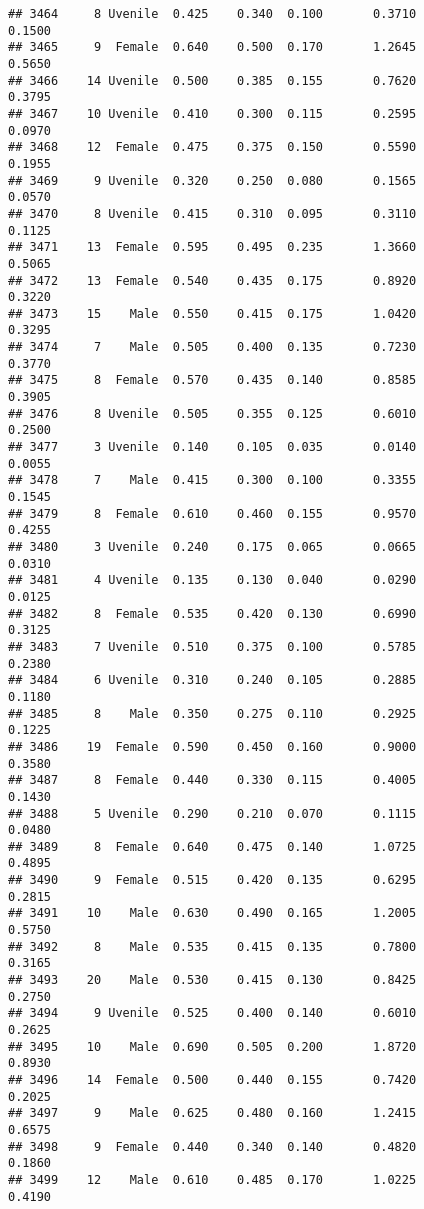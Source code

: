 \documentclass[
]{article}
\begin{document}
\begin{verbatim}
## 3464     8 Uvenile  0.425    0.340  0.100       0.3710         0.1500
## 3465     9  Female  0.640    0.500  0.170       1.2645         0.5650
## 3466    14 Uvenile  0.500    0.385  0.155       0.7620         0.3795
## 3467    10 Uvenile  0.410    0.300  0.115       0.2595         0.0970
## 3468    12  Female  0.475    0.375  0.150       0.5590         0.1955
## 3469     9 Uvenile  0.320    0.250  0.080       0.1565         0.0570
## 3470     8 Uvenile  0.415    0.310  0.095       0.3110         0.1125
## 3471    13  Female  0.595    0.495  0.235       1.3660         0.5065
## 3472    13  Female  0.540    0.435  0.175       0.8920         0.3220
## 3473    15    Male  0.550    0.415  0.175       1.0420         0.3295
## 3474     7    Male  0.505    0.400  0.135       0.7230         0.3770
## 3475     8  Female  0.570    0.435  0.140       0.8585         0.3905
## 3476     8 Uvenile  0.505    0.355  0.125       0.6010         0.2500
## 3477     3 Uvenile  0.140    0.105  0.035       0.0140         0.0055
## 3478     7    Male  0.415    0.300  0.100       0.3355         0.1545
## 3479     8  Female  0.610    0.460  0.155       0.9570         0.4255
## 3480     3 Uvenile  0.240    0.175  0.065       0.0665         0.0310
## 3481     4 Uvenile  0.135    0.130  0.040       0.0290         0.0125
## 3482     8  Female  0.535    0.420  0.130       0.6990         0.3125
## 3483     7 Uvenile  0.510    0.375  0.100       0.5785         0.2380
## 3484     6 Uvenile  0.310    0.240  0.105       0.2885         0.1180
## 3485     8    Male  0.350    0.275  0.110       0.2925         0.1225
## 3486    19  Female  0.590    0.450  0.160       0.9000         0.3580
## 3487     8  Female  0.440    0.330  0.115       0.4005         0.1430
## 3488     5 Uvenile  0.290    0.210  0.070       0.1115         0.0480
## 3489     8  Female  0.640    0.475  0.140       1.0725         0.4895
## 3490     9  Female  0.515    0.420  0.135       0.6295         0.2815
## 3491    10    Male  0.630    0.490  0.165       1.2005         0.5750
## 3492     8    Male  0.535    0.415  0.135       0.7800         0.3165
## 3493    20    Male  0.530    0.415  0.130       0.8425         0.2750
## 3494     9 Uvenile  0.525    0.400  0.140       0.6010         0.2625
## 3495    10    Male  0.690    0.505  0.200       1.8720         0.8930
## 3496    14  Female  0.500    0.440  0.155       0.7420         0.2025
## 3497     9    Male  0.625    0.480  0.160       1.2415         0.6575
## 3498     9  Female  0.440    0.340  0.140       0.4820         0.1860
## 3499    12    Male  0.610    0.485  0.170       1.0225         0.4190

\end{verbatim}
\end{document}
